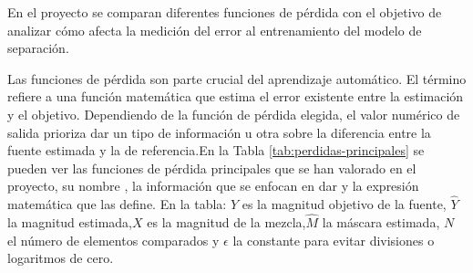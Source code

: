 En el proyecto se comparan diferentes funciones de pérdida con el objetivo de analizar cómo afecta la medición del error al entrenamiento del modelo de separación.

Las funciones de pérdida son parte crucial del aprendizaje automático. El término refiere a una función matemática que estima el error existente entre la estimación y el objetivo. Dependiendo de la función de pérdida elegida, el valor numérico de salida prioriza dar un tipo de información u otra sobre la diferencia entre la fuente estimada y la de referencia.En la Tabla \ref{tab:perdidas-principales} se pueden ver las funciones de pérdida principales que se han valorado en el proyecto, su nombre , la información que se enfocan en dar y la expresión matemática que las define. En la tabla:  \(Y\) es la magnitud objetivo de la fuente, \(\hat{Y}\) la magnitud estimada,\(X\) es la magnitud de la mezcla,\(\hat{M}\) la máscara estimada, \(N\) el número de elementos comparados y \(\epsilon\) la constante para evitar divisiones o logaritmos de cero.

